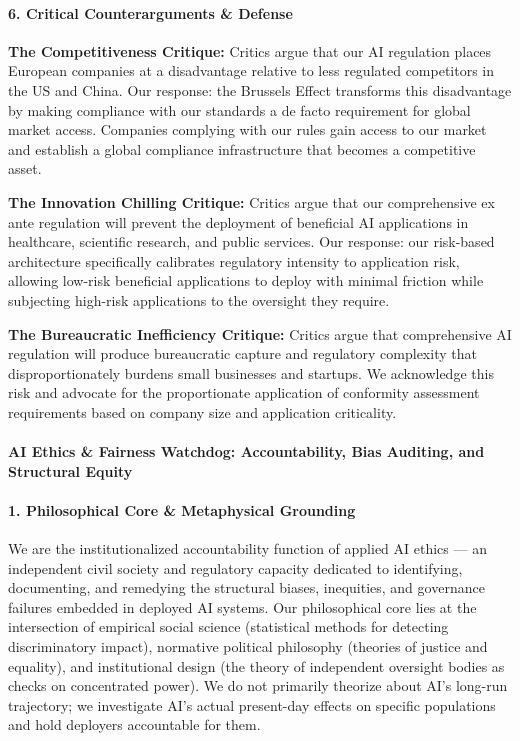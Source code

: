 \paragraph{6. Critical Counterarguments \&
Defense}\label{critical-counterarguments-defense-9}

\textbf{The Competitiveness Critique:} Critics argue that our AI
regulation places European companies at a disadvantage relative to less
regulated competitors in the US and China. Our response: the Brussels
Effect transforms this disadvantage by making compliance with our
standards a de facto requirement for global market access. Companies
complying with our rules gain access to our market and establish a
global compliance infrastructure that becomes a competitive asset.

\textbf{The Innovation Chilling Critique:} Critics argue that our
comprehensive ex ante regulation will prevent the deployment of
beneficial AI applications in healthcare, scientific research, and
public services. Our response: our risk-based architecture specifically
calibrates regulatory intensity to application risk, allowing low-risk
beneficial applications to deploy with minimal friction while subjecting
high-risk applications to the oversight they require.

\textbf{The Bureaucratic Inefficiency Critique:} Critics argue that
comprehensive AI regulation will produce bureaucratic capture and
regulatory complexity that disproportionately burdens small businesses
and startups. We acknowledge this risk and advocate for the
proportionate application of conformity assessment requirements based on
company size and application criticality.

\paragraph{AI Ethics \& Fairness Watchdog: Accountability, Bias
Auditing, and Structural
Equity}\label{ai-ethics-fairness-watchdog-accountability-bias-auditing-and-structural-equity}

\paragraph{1. Philosophical Core \& Metaphysical
Grounding}\label{philosophical-core-metaphysical-grounding-10}

We are the institutionalized accountability function of applied AI
ethics --- an independent civil society and regulatory capacity
dedicated to identifying, documenting, and remedying the structural
biases, inequities, and governance failures embedded in deployed AI
systems. Our philosophical core lies at the intersection of empirical
social science (statistical methods for detecting discriminatory
impact), normative political philosophy (theories of justice and
equality), and institutional design (the theory of independent oversight
bodies as checks on concentrated power). We do not primarily theorize
about AI's long-run trajectory; we investigate AI's actual present-day
effects on specific populations and hold deployers accountable for them.

